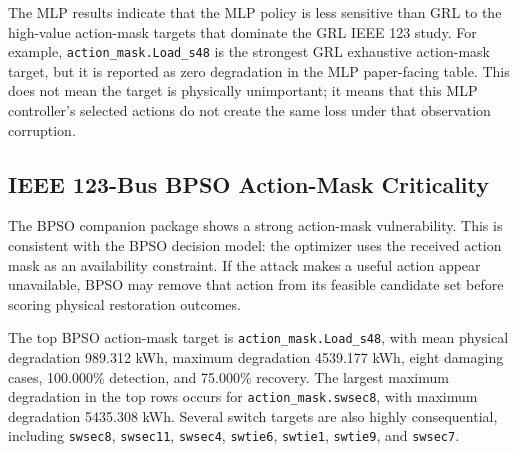 The MLP results indicate that the MLP policy is less sensitive than GRL to the high-value action-mask targets that dominate the GRL IEEE 123 study. For example, \texttt{action\_mask.Load\_s48} is the strongest GRL exhaustive action-mask target, but it is reported as zero degradation in the MLP paper-facing table. This does not mean the target is physically unimportant; it means that this MLP controller's selected actions do not create the same loss under that observation corruption.

\subsection{IEEE 123-Bus BPSO Action-Mask Criticality}
\label{subsec:ieee123_bpso_criticality}

The BPSO companion package shows a strong action-mask vulnerability. This is consistent with the BPSO decision model: the optimizer uses the received action mask as an availability constraint. If the attack makes a useful action appear unavailable, BPSO may remove that action from its feasible candidate set before scoring physical restoration outcomes.

The top BPSO action-mask target is \texttt{action\_mask.Load\_s48}, with mean physical degradation 989.312 kWh, maximum degradation 4539.177 kWh, eight damaging cases, 100.000\% detection, and 75.000\% recovery. The largest maximum degradation in the top rows occurs for \texttt{action\_mask.swsec8}, with maximum degradation 5435.308 kWh. Several switch targets are also highly consequential, including \texttt{swsec8}, \texttt{swsec11}, \texttt{swsec4}, \texttt{swtie6}, \texttt{swtie1}, \texttt{swtie9}, and \texttt{swsec7}.

